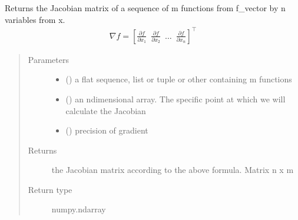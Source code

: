 \documentclass[letterpaper,10pt,english,openany,oneside]{sphinxmanual}
\begin{document}

\begin{fulllineitems}
\label{\detokenize{links:Inner_point.algorithms.jacobian}}
\sphinxAtStartPar
Returns the Jacobian matrix of a sequence of m functions from f\_vector by n variables from x.
\begin{equation}\label{equation:links:links:2}
\begin{split}\displaystyle \nabla f = \left[\frac{\partial f}{\partial x_1} \enspace \frac{\partial f}{\partial x_2}
\enspace \dots \enspace \frac{\partial f}{\partial x_n}\right]^\top\end{split}
\end{equation}\begin{quote}\begin{description}
\item[{Parameters}] \leavevmode\begin{itemize}
\item {} 
\sphinxAtStartPar
{} (\sphinxstyleliteralemphasis{\sphinxupquote{{[}}}\sphinxstyleliteralemphasis{\sphinxupquote{{[}}}\sphinxstyleliteralemphasis{\sphinxupquote{{[}}}\sphinxstyleliteralemphasis{\sphinxupquote{{]}}}\sphinxstyleliteralemphasis{\sphinxupquote{, }}\sphinxstyleliteralemphasis{\sphinxupquote{{]}}}\sphinxstyleliteralemphasis{\sphinxupquote{{]}}}) \textendash{} a flat sequence, list or tuple or other containing m functions

\item {} 
\sphinxAtStartPar
{} () \textendash{} an n\sphinxhyphen{}dimensional array. The specific point at which we will calculate the Jacobian

\item {} 
\sphinxAtStartPar
{} () \textendash{} precision of gradient

\end{itemize}

\item[{Returns}] \leavevmode
\sphinxAtStartPar
the Jacobian matrix according to the above formula. Matrix n x m

\item[{Return type}] \leavevmode
\sphinxAtStartPar
numpy.ndarray

\end{description}\end{quote}

\end{fulllineitems}
\end{document}
